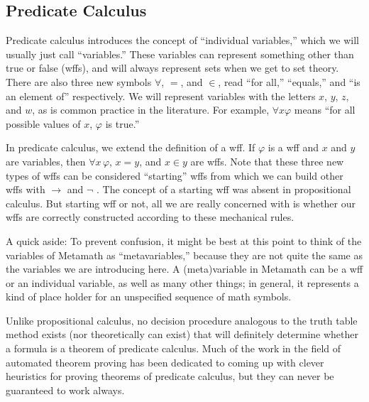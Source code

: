 \subsection{Predicate Calculus}

Predicate calculus introduces the concept of
``individual variables,'' which
we will usually just call ``variables.''
These variables can represent something other than true or false (wffs),
and will always represent sets when we get to set theory.  There are also
three new symbols $\forall$,
$=$, and $\in$,
read ``for all,'' ``equals,'' and ``is an element of''
respectively.  We will represent variables with the letters $x$, $y$, $z$, and
$w$, as is common practice in the literature.
For example, $\forall x \varphi$ means ``for all possible values of
$x$, $\varphi$ is true.''

In predicate calculus, we extend the definition of a wff.  If $\varphi$ is a wff and $x$ and $y$ are variables, then
$\forall x \, \varphi$, $x=y$, and $x\in y$ are wffs. Note that these three new
types of wffs can be considered ``starting'' wffs from which we can build
other wffs with $\rightarrow$ and $\neg$ .  The concept of a starting wff was
absent in propositional calculus.  But starting wff or not, all we are really
concerned with is whether our wffs are correctly constructed according to
these mechanical rules.

A quick aside:
To prevent confusion, it might be best at this point to think of the variables
of Metamath as ``metavariables,'' because
they are not quite the same as the variables we are introducing here.  A
(meta)variable in Metamath can be a wff or an individual variable, as well
as many other things; in general, it represents a kind of place holder for an
unspecified sequence of math symbols.

Unlike propositional calculus, no decision procedure
analogous to the truth table method exists (nor theoretically can exist) that
will definitely determine whether a formula is a theorem of predicate
calculus.  Much of the work in the field of automated theorem
proving has been dedicated to coming up with
clever heuristics for proving theorems of predicate calculus, but they can
never be guaranteed to work always.

